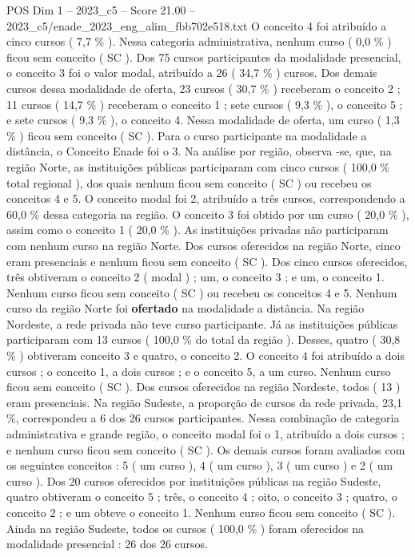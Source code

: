 \begin{textsample}{POS Dim 1 – 2023\_c5 – Score 21.00 – 2023\_c5/enade\_2023\_eng\_alim\_fbb702e518.txt}
O conceito 4 foi atribuído a cinco cursos ( 7,7 \% ).
Nessa categoria administrativa, nenhum curso ( 0,0 \% ) ficou sem conceito ( SC ).
Dos 75 cursos participantes da modalidade presencial, o conceito 3 foi o valor modal, atribuído a 26 ( 34,7 \% ) cursos.
Dos demais cursos dessa modalidade de oferta, 23 cursos ( 30,7 \% ) receberam o conceito 2 ; 11 cursos ( 14,7 \% ) receberam o conceito 1 ; sete cursos ( 9,3 \% ), o conceito 5 ; e sete cursos ( 9,3 \% ), o conceito 4.
Nessa modalidade de oferta, um curso ( 1,3 \% ) ficou sem conceito ( SC ).
Para o curso participante na modalidade a distância, o Conceito Enade foi o 3.
Na análise por região, observa -se, que, na região Norte, as instituições públicas participaram com cinco cursos ( 100,0 \% total regional ), dos quais nenhum ficou sem conceito ( SC ) ou recebeu os conceitos 4 e 5.
O conceito modal foi 2, atribuído a três cursos, correspondendo a 60,0 \% dessa categoria na região.
O conceito 3 foi obtido por um curso ( 20,0 \% ), assim como o conceito 1 ( 20,0 \% ).
As instituições privadas não participaram com nenhum curso na região Norte.
Dos cursos oferecidos na região Norte, cinco eram presenciais e nenhum ficou sem conceito ( SC ).
Dos cinco cursos oferecidos, três obtiveram o conceito 2 ( modal ) ; um, o conceito 3 ; e um, o conceito 1.
Nenhum curso ficou sem conceito ( SC ) ou recebeu os conceitos 4 e 5.
Nenhum curso da região Norte foi \textbf{ofertado} na modalidade a distância.
Na região Nordeste, a rede privada não teve curso participante.
Já as instituições públicas participaram com 13 cursos ( 100,0 \% do total da região ).
Desses, quatro ( 30,8 \% ) obtiveram conceito 3 e quatro, o conceito 2.
O conceito 4 foi atribuído a dois cursos ; o conceito 1, a dois cursos ; e o conceito 5, a um curso.
Nenhum curso ficou sem conceito ( SC ).
Dos cursos oferecidos na região Nordeste, todos ( 13 ) eram presenciais.
Na região Sudeste, a proporção de cursos da rede privada, 23,1 \%, correspondeu a 6 dos 26 cursos participantes.
Nessa combinação de categoria administrativa e grande região, o conceito modal foi o 1, atribuído a dois cursos ; e nenhum curso ficou sem conceito ( SC ).
Os demais cursos foram avaliados com os seguintes conceitos : 5 ( um curso ), 4 ( um curso ), 3 ( um curso ) e 2 ( um curso ).
Dos 20 cursos oferecidos por instituições públicas na região Sudeste, quatro obtiveram o conceito 5 ; três, o conceito 4 ; oito, o conceito 3 ; quatro, o conceito 2 ; e um obteve o conceito 1.
Nenhum curso ficou sem conceito ( SC ).
Ainda na região Sudeste, todos os cursos ( 100,0 \% ) foram oferecidos na modalidade presencial : 26 dos 26 cursos.

\end{textsample}
